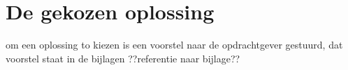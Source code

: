 \chapter{De gekozen oplossing}
\label{De_gekozen_oplossing}

om een oplossing to kiezen is een voorstel naar de opdrachtgever gestuurd, dat voorstel staat in de bijlagen ??referentie naar bijlage??




